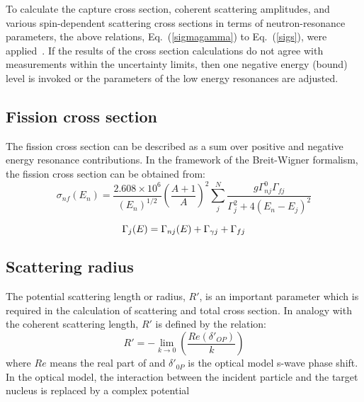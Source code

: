 \documentclass[twocolumn,amsmath,amssymb,10pt,groupedaddress,a4paper]{revtex4}
\begin{document}
To calculate the capture cross section, coherent scattering amplitudes, and various spin-dependent scattering cross
sections in terms of neutron-resonance parameters, the above relations, Eq.~(\ref{sigmagamma}) to Eq.~(\ref{sigs}),
were applied~\cite{Mughabghab:06}. If the results of the cross section calculations do not agree with measurements
within the uncertainty limits, then one negative energy (bound) level is invoked or the parameters of the low
energy resonances are adjusted.

\subsection{Fission cross section}

The fission cross section can be described as a sum over positive and negative energy resonance contributions. In the
framework of the Breit-Wigner formalism, the fission cross section can be obtained from:
\begin{equation}
\sigma_{nf}(E_n) = \frac{2.608 \times 10^6}{(E_n)^{1/2}} \left(\frac{A+1}{A}\right)^2 \sum_j^N \frac{g\Gamma_{nj}^0
\Gamma_{fj}}{\Gamma_j^2+4(E_n-E_j)^2}
\end{equation}

\begin{equation}
\Gamma_j(E) = \Gamma_{nj}(E) + \Gamma_{\gamma j} + \Gamma_{fj} \notag
\end{equation}
\subsection{Scattering radius}

The potential scattering length or radius, $R'$, is an important parameter which is required in the calculation of
scattering and total cross section. In analogy with the coherent scattering length, $R'$ is defined by the relation:
\begin{equation}
R' = -\lim_{k \to 0} \left( \frac{Re(\delta'_{OP})}{k} \right)
\end{equation}
\noindent where $Re$ means the real part of and $\delta'_{0P}$ is the optical model s-wave phase shift.
In the optical model, the interaction between the incident particle and the target nucleus
is replaced by a complex potential
\end{document}
